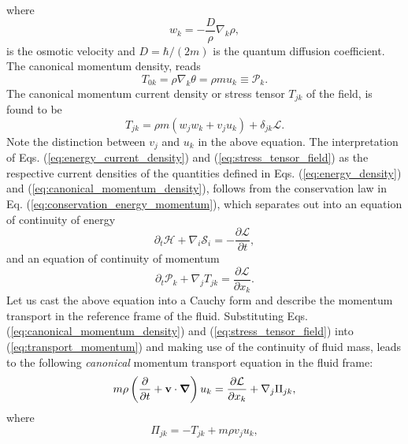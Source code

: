 \documentclass[twocolumn, nofootinbib, nobibnotes, amsmath,amssymb,aps, pra, floatfix]{revtex4-1}
\renewcommand{\v}[1]{\ensuremath{\mathbf{#1}}} %
\newcommand{\gv}[1]{\ensuremath{\mbox{\boldmath$ #1 $}}} %
\newcommand{\pd}[2]{\frac{\partial #1}{\partial #2}} %
\newcommand{\grad}[1]{\gv{\nabla} #1} %
\begin{document}
where 
\begin{equation}
  w_k=-\frac{D}{\rho}\nabla_k\rho,
  \label{eq:osmotic_velocity}
\end{equation}
is the osmotic velocity \cite{nelson1966derivation,wyatt2006quantum,faris2014diffusion} and $D=\hbar/\left( 2m \right)$ is the quantum diffusion coefficient. 
The canonical momentum density, reads
\begin{equation}
  T_{0k}=\rho\nabla_k\theta=\rho m u_k\equiv \mathcal{P}_k.
  \label{eq:canonical_momentum_density}
\end{equation}
The canonical momentum current density or stress tensor $T_{jk}$ of the field, is found to be
\begin{equation}
  T_{jk}=\rho m\left( w_jw_k+v_ju_k \right)+\delta_{jk}\mathcal{L}.
  \label{eq:stress_tensor_field}
\end{equation}
Note the distinction between $v_j$ and $u_k$ in the above equation.
The interpretation of Eqs. (\ref{eq:energy_current_density}) and (\ref{eq:stress_tensor_field}) as the respective current densities of the quantities defined in Eqs. (\ref{eq:energy_density}) and (\ref{eq:canonical_momentum_density}), follows from the conservation law in Eq. (\ref{eq:conservation_energy_momentum}), which separates out into an equation of continuity of energy
\begin{equation}
    \partial_t\mathcal{H}+\nabla_i\mathcal{S}_i=-\pd{\mathcal{L}}{t},
  \label{eq:transport_energy}
\end{equation}
and an equation of continuity of momentum
\begin{equation}
  \partial_t \mathcal{P}_k+\nabla_j T_{jk}=\pd{\mathcal{L}}{x_k}.
  \label{eq:transport_momentum}
\end{equation}
Let us cast the above equation into a Cauchy form \cite{aris2012vectors} and describe the momentum transport in the reference frame of the fluid.
Substituting Eqs. (\ref{eq:canonical_momentum_density}) and (\ref{eq:stress_tensor_field}) into (\ref{eq:transport_momentum}) and making use of the continuity of fluid mass, leads to the following \textit{canonical} momentum transport equation in the fluid frame:
\begin{equation}
  m\rho\left( \pd{}{t}+\v{v}\cdot\grad{} \right)u_k=\pd{\mathcal{L}}{x_k}+\nabla_j\Pi_{jk},
  \label{eq:Cauchy_equation_canonical_momentum_1}
\end{equation}
where
\begin{equation}
  \Pi_{jk}=-T_{jk}+m\rho v_ju_k,
  \label{eq:stress_tensor_relation_moving_frame}
\end{equation}
\end{document}
